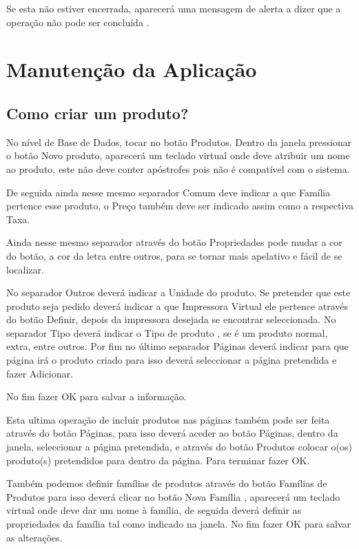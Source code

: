 \documentclass[a4paper,11pt,openany]{memoir}
\begin{document}
Se esta não estiver encerrada, aparecerá uma mensagem de
alerta a dizer que a operação não pode ser concluída .


\chapter{Manutenção da Aplicação}

\section{Como criar um produto?}

No nível de Base de Dados, tocar no botão Produtos. Dentro da janela pressionar o
botão Novo produto, aparecerá um teclado virtual onde deve atribuir um nome ao
produto, este não deve conter apóstrofes pois não é compatível com o sistema.

De seguida ainda nesse mesmo separador Comum deve indicar a que Família pertence
esse produto, o Preço também deve ser indicado assim como a respectiva Taxa.

Ainda nesse mesmo separador através do botão Propriedades pode mudar a cor do
botão, a cor da letra entre outros, para se tornar mais apelativo e fácil de se
localizar. 

No separador Outros deverá indicar a Unidade do produto. Se pretender
que este produto seja pedido deverá indicar a que Impressora Virtual ele pertence
através do botão Definir, depois da impressora desejada se encontrar seleccionada.
No separador Tipo deverá indicar o Tipo de produto , se é um produto normal, extra,
entre outros. Por fim no último separador Páginas deverá indicar para que página irá
o produto criado para isso deverá seleccionar a página pretendida e fazer Adicionar.

No fim fazer OK para salvar a informação. 

Esta ultima operação de incluir produtos
nas páginas também pode ser feita através do botão Páginas, para isso deverá
aceder ao botão Páginas, dentro da janela, seleccionar a página pretendida, e
através do botão Produtos colocar o(os) produto(s) pretendidos para dentro da
página. Para terminar fazer OK. 

Também podemos definir famílias de produtos
através do botão Famílias de Produtos para isso deverá clicar no botão Nova
Família , aparecerá um teclado virtual onde deve dar um nome à família, de seguida
deverá definir as propriedades da família tal como indicado na janela. No fim fazer
OK para salvar as alterações.
\end{document}
